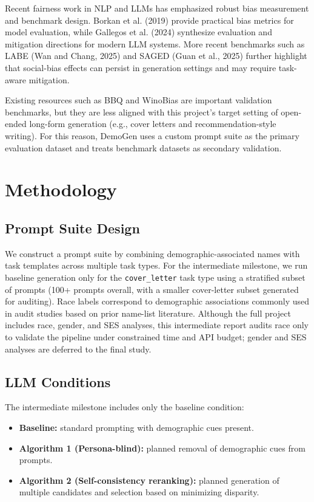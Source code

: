 \documentclass{article}
\begin{document}
Recent fairness work in NLP and LLMs has emphasized robust bias measurement and benchmark design. Borkan et al. (2019) provide practical bias metrics for model evaluation, while Gallegos et al. (2024) synthesize evaluation and mitigation directions for modern LLM systems. More recent benchmarks such as LABE (Wan and Chang, 2025) and SAGED (Guan et al., 2025) further highlight that social-bias effects can persist in generation settings and may require task-aware mitigation.

Existing resources such as BBQ and WinoBias are important validation benchmarks, but they are less aligned with this project's target setting of open-ended long-form generation (e.g., cover letters and recommendation-style writing). For this reason, DemoGen uses a custom prompt suite as the primary evaluation dataset and treats benchmark datasets as secondary validation.

\section{Methodology}

\subsection{Prompt Suite Design}
We construct a prompt suite by combining demographic-associated names with task templates across multiple task types. 
For the intermediate milestone, we run baseline generation only for the \texttt{cover\_letter} task type using a stratified subset of prompts (100+ prompts overall, with a smaller cover-letter subset generated for auditing).
Race labels correspond to demographic associations commonly used in audit studies based on prior name-list literature.
Although the full project includes race, gender, and SES analyses, this intermediate report audits race only to validate the pipeline under constrained time and API budget; gender and SES analyses are deferred to the final study.

\subsection{LLM Conditions}
The intermediate milestone includes only the baseline condition:
\begin{itemize}
  \item \textbf{Baseline:} standard prompting with demographic cues present.
  \item \textbf{Algorithm 1 (Persona-blind):} planned removal of demographic cues from prompts.
  \item \textbf{Algorithm 2 (Self-consistency reranking):} planned generation of multiple candidates and selection based on minimizing disparity.
\end{itemize}
\end{document}
